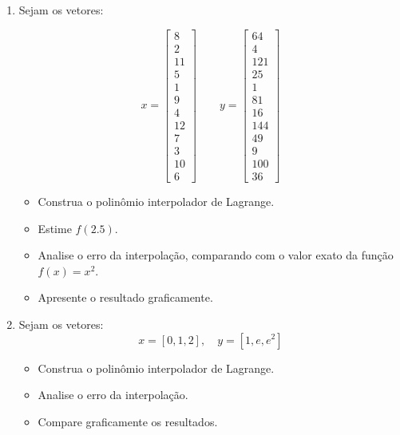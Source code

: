 \begin{enumerate}[label=\thesection.\arabic*]
\subsection*{Interpolação de Lagrange}

\item Sejam os vetores:

\[
x=
\begin{bmatrix}
8\\2\\11\\5\\1\\9\\4\\12\\7\\3\\10\\6
\end{bmatrix}
\qquad
y=
\begin{bmatrix}
64\\4\\121\\25\\1\\81\\16\\144\\49\\9\\100\\36
\end{bmatrix}
\]

\begin{itemize}
    \item Construa o polinômio interpolador de Lagrange.
    \item Estime $f(2.5)$.
    \item Analise o erro da interpolação, comparando com o valor exato da função $f(x) = x^2$.
    \item Apresente o resultado graficamente.
\end{itemize}

\item Sejam os vetores:
\[
x = [0, 1, 2], \quad y = [1, e, e^2]
\]

\begin{itemize}
    \item Construa o polinômio interpolador de Lagrange.
    \item Analise o erro da interpolação.
    \item Compare graficamente os resultados.
\end{itemize}


\end{enumerate}
